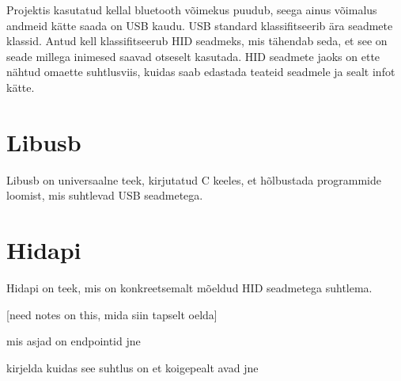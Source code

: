 
Projektis kasutatud kellal bluetooth võimekus puudub, seega ainus võimalus andmeid kätte saada on USB kaudu.
USB standard klassifitseerib ära seadmete klassid. Antud kell klassifitseerub HID seadmeks, mis tähendab seda, et see on seade millega inimesed saavad otseselt kasutada.
HID seadmete jaoks on ette nähtud omaette suhtlusviis, kuidas saab edastada teateid seadmele ja sealt infot kätte.


\section{Libusb}\label{sec:libusb}
Libusb on universaalne teek, kirjutatud C keeles, et hõlbustada programmide loomist, mis suhtlevad USB seadmetega.


\section{Hidapi}
Hidapi on teek, mis on konkreetsemalt mõeldud HID seadmetega suhtlema.

[need notes on this, mida siin tapselt oelda]

mis asjad on endpointid jne

kirjelda kuidas see suhtlus on et koigepealt avad jne 
